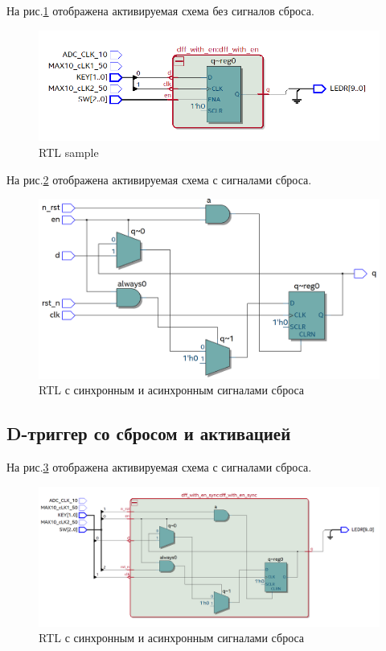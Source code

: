 \documentclass[a4paper,14pt]{article}
\begin{document}

На рис.\ref{fig:9_RTL_sample} отображена активируемая схема без сигналов сброса.

\begin{figure}[H]
	\centering
	\includegraphics[width=0.9\linewidth]{imgs/9_RTL_sample}
	\caption{RTL sample}
	\label{fig:9_RTL_sample}
\end{figure}

На рис.\ref{fig:9_RTL_sync} отображена активируемая схема с сигналами сброса.

\begin{figure}[H]
	\centering
	\includegraphics[width=0.9\linewidth]{imgs/9_RTL_sync}
	\caption{RTL с синхронным и асинхронным сигналами сброса}
	\label{fig:9_RTL_sync}
\end{figure}


\subsection{D-триггер со сбросом и активацией}


На рис.\ref{fig:10_RTL} отображена активируемая схема с сигналами сброса.

\begin{figure}[H]
	\centering
	\includegraphics[width=0.9\linewidth]{imgs/10_RTL}
	\caption{RTL с синхронным и асинхронным сигналами сброса}
	\label{fig:10_RTL}
\end{figure}
\end{document}
